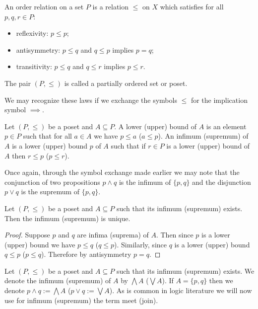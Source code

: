\begin{definition}
An order relation on a set $P$ is a relation $\leq$ on $X$ which satisfies for all $p,q,r\in P$:
\begin{itemize}
\item reflexivity: $p\leq p$;
\item antisymmetry: $p\leq q$ and $q\leq p$ implies $p=q$;
\item transitivity: $p\leq q$ and $q\leq r$ implies $p\leq r$.
\end{itemize}
The pair $(P,\leq)$ is called a partially ordered set or poset.
\end{definition}

We may recognize these laws if we exchange the symbols $\leq$ for the implication symbol $\implies$. 

\begin{definition}
Let $(P,\leq)$ be a poset and $A\subseteq P$. A lower (upper) bound of $A$ is an element $p\in P$ such that for all $a \in A$ we have $p\leq a$ ($a\leq p$). An infimum (supremum) of $A$ is a lower (upper) bound $p$ of $A$ such that if $r\in P$ is a lower (upper) bound of $A$ then $r\leq p$ ($p\leq r$).     
\end{definition}

Once again, through the symbol exchange made earlier we may note that the conjunction of two propositions $p\wedge q$ is the infimum of $\{p,q\}$ and the disjunction $p\vee q$ is the supremum of $\{p,q\}$. 

\begin{theorem}
Let $(P,\leq)$ be a poset and $A\subseteq P$ such that its infimum (supremum) exists. Then the infimum (supremum) is unique. 
\end{theorem}

\begin{proof}
Suppose $p$ and $q$ are infima (suprema) of $A$. Then since $p$ is a lower (upper) bound we have $p\leq q$ ($q\leq p$). Similarly, since $q$ is a lower (upper) bound $q\leq p$ ($p\leq q$). Therefore by antisymmetry $p=q$.  
\end{proof}

\begin{notation}
Let $(P,\leq)$ be a poset and $A\subseteq P$ such that its infimum (supremum) exists. We denote the infimum (supremum) of $A$ by $\bigwedge A$ ($\bigvee A$). If $A=\{p,q\}$ then we denote $p\wedge q :=\bigwedge A$ ($p\vee q := \bigvee A$). As is common in logic literature we will now use for infimum (supremum) the term meet (join). 
\end{notation}

